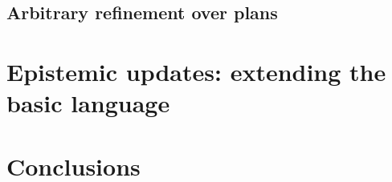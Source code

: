 \documentclass{sn-jnl}%
\begin{document}
\subsection{Arbitrary refinement over plans}
\label{sec:aref}


% 

\section{Epistemic updates: extending the basic language}
\label{sec:extension}













\section{Conclusions}
\label{sec:final}


 


% 
\end{document}
